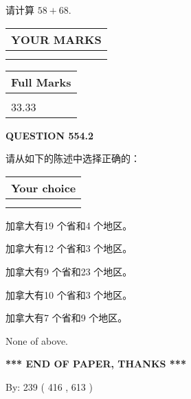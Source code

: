 \documentclass{ctexart}
\begin{document}
  
 
请计算 $ %
58 +  %
68 $.
 

 

 
  
\vspace{0.2in}
  
\noindent\begin{tabular}{|l|}
\hline
 YOUR MARKS  \\
\hline
 \\ 
 \\ 
\hline
\end{tabular}
\hspace{0.05in} \begin{tabular}{|l|}
\hline
 Full Marks  \\
\hline
 \\ 
33.33 \\
\hline
\end{tabular}
{\textbf{\Large{QUESTION
554.2 
}}}
  
  
请从如下的陈述中选择正确的：
  
  
\noindent\hspace{3.0in} \begin{tabular}{|l|}
\hline
Your choice \\
\hline
 \\ 
 \\ 
\hline
\end{tabular}
  
  
 
 
加拿大有19 个省和4 个地区。
 
 
加拿大有12 个省和3 个地区。
 
 
加拿大有9 个省和23 个地区。
 
 
加拿大有10 个省和3 个地区。
 
 
加拿大有7 个省和9 个地区。
 
 
 None of above.
 
 
   
   
 \vspace{0.2in}
 
   
   
   
   
\vspace{1.0in} 
{\textbf{\large{ *** END OF PAPER, THANKS *** }}} 
   
   
\hspace{1.0in} By: 
 239 ( 416 ,  613 )
   
\end{document}

